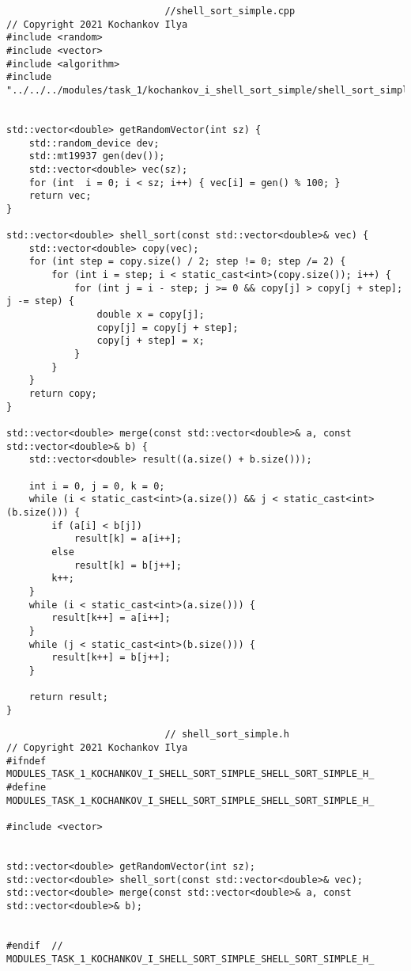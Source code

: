 \documentclass{report}
\begin{document}
\begin{lstlisting}
							//shell_sort_simple.cpp
// Copyright 2021 Kochankov Ilya
#include <random>
#include <vector>
#include <algorithm>
#include "../../../modules/task_1/kochankov_i_shell_sort_simple/shell_sort_simple.h"


std::vector<double> getRandomVector(int sz) {
    std::random_device dev;
    std::mt19937 gen(dev());
    std::vector<double> vec(sz);
    for (int  i = 0; i < sz; i++) { vec[i] = gen() % 100; }
    return vec;
}

std::vector<double> shell_sort(const std::vector<double>& vec) {
    std::vector<double> copy(vec);
    for (int step = copy.size() / 2; step != 0; step /= 2) {
        for (int i = step; i < static_cast<int>(copy.size()); i++) {
            for (int j = i - step; j >= 0 && copy[j] > copy[j + step]; j -= step) {
                double x = copy[j];
                copy[j] = copy[j + step];
                copy[j + step] = x;
            }
        }
    }
    return copy;
}

std::vector<double> merge(const std::vector<double>& a, const std::vector<double>& b) {
    std::vector<double> result((a.size() + b.size()));

    int i = 0, j = 0, k = 0;
    while (i < static_cast<int>(a.size()) && j < static_cast<int>(b.size())) {
        if (a[i] < b[j])
            result[k] = a[i++];
        else
            result[k] = b[j++];
        k++;
    }
    while (i < static_cast<int>(a.size())) {
        result[k++] = a[i++];
    }
    while (j < static_cast<int>(b.size())) {
        result[k++] = b[j++];
    }

    return result;
}

\end{lstlisting}
\begin{lstlisting}
							// shell_sort_simple.h
// Copyright 2021 Kochankov Ilya
#ifndef MODULES_TASK_1_KOCHANKOV_I_SHELL_SORT_SIMPLE_SHELL_SORT_SIMPLE_H_
#define MODULES_TASK_1_KOCHANKOV_I_SHELL_SORT_SIMPLE_SHELL_SORT_SIMPLE_H_

#include <vector>


std::vector<double> getRandomVector(int sz);
std::vector<double> shell_sort(const std::vector<double>& vec);
std::vector<double> merge(const std::vector<double>& a, const std::vector<double>& b);


#endif  // MODULES_TASK_1_KOCHANKOV_I_SHELL_SORT_SIMPLE_SHELL_SORT_SIMPLE_H_

\end{lstlisting}
\end{document}
